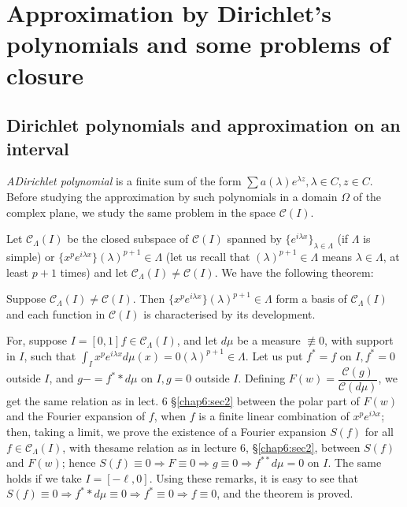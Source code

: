 \chapter[Approximation by Dirichlet's polynomials and...]{Approximation by Dirichlet's polynomials and some
 problems of closure}\label{chap8} %

\section{Dirichlet polynomials and approximation on an
  interval}\label{chap8:sec1}  %

\textit{A\pageoriginale Dirichlet polynomial} is a finite sum of the form $\sum a
(\lambda) e^{\lambda z}, \lambda \in C, z \in C$. Before studying the
approximation by such polynomials in a domain $\Omega$ of the complex
plane, we study the same problem in the space $\mathscr{C} (I)$. 

Let $\mathscr{C}_\Lambda (I)$ be the closed subspace of $\mathscr{C}
(I)$ spanned by $\Big\{e^{i \lambda x}\Big\}_{\lambda \in \Lambda}$
(if $\Lambda$ is simple) or $\Big\{x^p e^{i \lambda x}\Big\}
(\lambda)^{p + 1} \in \Lambda$ (let us recall that $(\lambda)^{p + 1}
\in \Lambda$ means $\lambda \in \Lambda$, at least $p + 1$ times) and
let $\mathscr{C}_\Lambda (I) \neq \mathscr{C} (I)$. We have the
following theorem: 
\begin{theorem*}
 Suppose $\mathscr{C}_\Lambda (I) \neq \mathscr{C}(I)$. Then
 $\Big\{x^p e^{i \lambda x}\Big\} (\lambda)^{p + 1} \in \Lambda$ form
 a basis of $\mathscr{C}_\Lambda (I)$ and each function in
 $\mathscr{C}(I)$ is characterised by its development. 

 For, suppose $I = [0, 1] f \in \mathscr{C}_\Lambda (I)$, and let $d
 \mu$ be a measure $\nequiv 0$, with support in $I$, such that
 $\int_I x^p e^{i \lambda x} d \mu (x) = 0 (\lambda)^{p + 1} \in
 \Lambda$. Let us put $f^* = f$ on $I, f^* = 0$ outside $I$, and $g-
 = f^* \ast d \mu$ on $I, g = 0$ outside $I$. Defining $F(w) =
 \dfrac{\mathscr{C}(g)}{\mathscr{C}(d \mu)}$, we get the same
 relation as in lect. 6 \S\ref{chap6:sec2} between the polar part of $F(w)$ and
 the Fourier expansion of $f$, when $f$ is a finite linear
 combination of $x^p e^{i \lambda x}$; then, taking a limit, we prove
 the existence of a Fourier expansion $S(f)$ for all $f \in
 \mathscr{C}_\Lambda (I)$, with the\pageoriginale same relation as in lecture 6,
 \S\ref{chap6:sec2}, between $S(f)$ and $F(w)$; hence $S(f) \equiv 0
 \Longrightarrow F \equiv 0 \Longrightarrow g \equiv 0
 \Longrightarrow f^{**} d \mu = 0$ on $I$. The same holds if we take
 $I = [- \ell, 0]$. Using these remarks, it is easy to see that $S(f)
 \equiv 0 \Longrightarrow f^* \ast d \mu \equiv 0 \Longrightarrow f^*
 \equiv 0 \Longrightarrow f \equiv 0$, and the theorem is proved. 
\end{theorem*}

